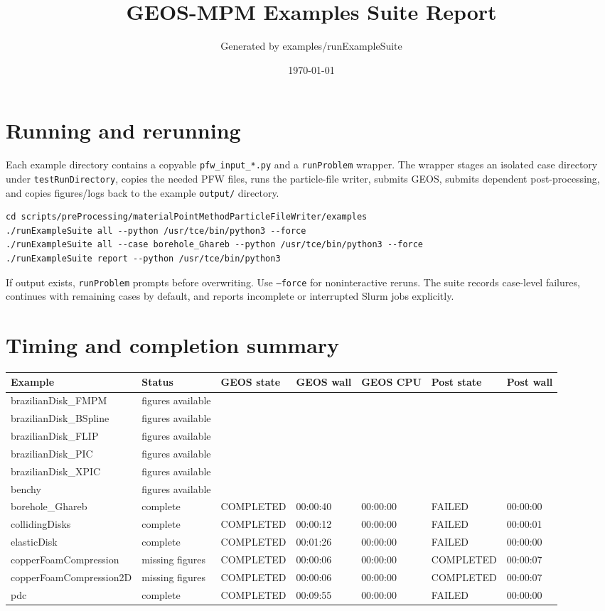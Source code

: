 \documentclass[10pt]{article}
\begin{document}
\title{GEOS-MPM Examples Suite Report}
\author{Generated by examples/runExampleSuite}
\date{\today}
\maketitle
\section*{Running and rerunning}
Each example directory contains a copyable \texttt{pfw\_input\_*.py} and a \texttt{runProblem} wrapper. The wrapper stages an isolated case directory under \texttt{testRunDirectory}, copies the needed PFW files, runs the particle-file writer, submits GEOS, submits dependent post-processing, and copies figures/logs back to the example \texttt{output/} directory.
\begin{verbatim}
cd scripts/preProcessing/materialPointMethodParticleFileWriter/examples
./runExampleSuite all --python /usr/tce/bin/python3 --force
./runExampleSuite all --case borehole_Ghareb --python /usr/tce/bin/python3 --force
./runExampleSuite report --python /usr/tce/bin/python3
\end{verbatim}
If output exists, \texttt{runProblem} prompts before overwriting. Use \texttt{--force} for noninteractive reruns. The suite records case-level failures, continues with remaining cases by default, and reports incomplete or interrupted Slurm jobs explicitly.
\section*{Timing and completion summary}
\begin{longtable}{p{}p{}p{}p{}p{}p{}p{}}
\toprule
Example & Status & GEOS state & GEOS wall & GEOS CPU & Post state & Post wall \\
\midrule
\endhead
brazilianDisk\_FMPM & figures available &  &  &  &  &  \\
brazilianDisk\_BSpline & figures available &  &  &  &  &  \\
brazilianDisk\_FLIP & figures available &  &  &  &  &  \\
brazilianDisk\_PIC & figures available &  &  &  &  &  \\
brazilianDisk\_XPIC & figures available &  &  &  &  &  \\
benchy & figures available &  &  &  &  &  \\
borehole\_Ghareb & complete & COMPLETED & 00:00:40 & 00:00:00 & FAILED & 00:00:00 \\
collidingDisks & complete & COMPLETED & 00:00:12 & 00:00:00 & FAILED & 00:00:01 \\
elasticDisk & complete & COMPLETED & 00:01:26 & 00:00:00 & FAILED & 00:00:00 \\
copperFoamCompression & missing figures & COMPLETED & 00:00:06 & 00:00:00 & COMPLETED & 00:00:07 \\
copperFoamCompression2D & missing figures & COMPLETED & 00:00:06 & 00:00:00 & COMPLETED & 00:00:07 \\
pdc & complete & COMPLETED & 00:09:55 & 00:00:00 & FAILED & 00:00:00 \\
\bottomrule
\end{longtable}
\end{document}
